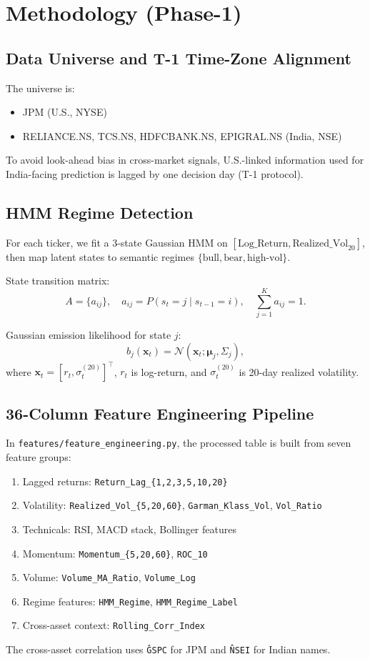\documentclass[conference]{IEEEtran}
\begin{document}
\section{Methodology (Phase-1)}
\subsection{Data Universe and T-1 Time-Zone Alignment}
The universe is:
\begin{itemize}
\item JPM (U.S., NYSE)
\item RELIANCE.NS, TCS.NS, HDFCBANK.NS, EPIGRAL.NS (India, NSE)
\end{itemize}
To avoid look-ahead bias in cross-market signals, U.S.-linked information used for India-facing prediction is lagged by one decision day (T-1 protocol).

\subsection{HMM Regime Detection}
For each ticker, we fit a 3-state Gaussian HMM on \(\left[\text{Log\_Return}, \text{Realized\_Vol}_{20}\right]\), then map latent states to semantic regimes \(\{\text{bull},\text{bear},\text{high-vol}\}\).

State transition matrix:
\begin{equation}
A=\{a_{ij}\}, \quad a_{ij}=P(s_t=j\mid s_{t-1}=i), \quad \sum_{j=1}^{K}a_{ij}=1.
\end{equation}

Gaussian emission likelihood for state \(j\):
\begin{equation}
b_j(\mathbf{x}_t)=\mathcal{N}(\mathbf{x}_t;\boldsymbol{\mu}_j,\Sigma_j),
\end{equation}
where \(\mathbf{x}_t=[r_t,\sigma^{(20)}_t]^\top\), \(r_t\) is log-return, and \(\sigma^{(20)}_t\) is 20-day realized volatility.

\subsection{36-Column Feature Engineering Pipeline}
In \texttt{features/feature\_engineering.py}, the processed table is built from seven feature groups:
\begin{enumerate}
\item Lagged returns: \texttt{Return\_Lag\_\{1,2,3,5,10,20\}}
\item Volatility: \texttt{Realized\_Vol\_\{5,20,60\}}, \texttt{Garman\_Klass\_Vol}, \texttt{Vol\_Ratio}
\item Technicals: RSI, MACD stack, Bollinger features
\item Momentum: \texttt{Momentum\_\{5,20,60\}}, \texttt{ROC\_10}
\item Volume: \texttt{Volume\_MA\_Ratio}, \texttt{Volume\_Log}
\item Regime features: \texttt{HMM\_Regime}, \texttt{HMM\_Regime\_Label}
\item Cross-asset context: \texttt{Rolling\_Corr\_Index}
\end{enumerate}
The cross-asset correlation uses \texttt{\^GSPC} for JPM and \texttt{\^NSEI} for Indian names.
\end{document}

